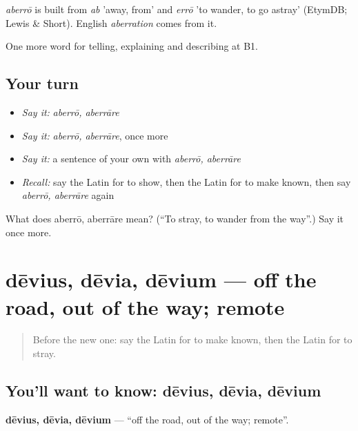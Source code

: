 \begin{cousinweb}
\emph{aberrō} is built from \emph{ab} 'away, from' and \emph{errō} 'to wander, to go astray' (EtymDB; Lewis \& Short). English \emph{aberration} comes from it.
\end{cousinweb}

\begin{grammarlens}[title={What you've built}]
One more word for telling, explaining and describing at B1.
\end{grammarlens}

\subsection*{Your turn}
\begin{itemize}
\raggedright
  \item \emph{Say it:} \emph{aberrō, aberrāre}
  \item \emph{Say it:} \emph{aberrō, aberrāre}, once more
  \item \emph{Say it:} a sentence of your own with \emph{aberrō, aberrāre}
  \item \emph{Recall:} say the Latin for to show, then the Latin for to make known, then say \emph{aberrō, aberrāre} again
\end{itemize}

\begin{tcolorbox}[breakable,colback=teal!4,colframe=teal!35!black,title={Before you move on}]
What does aberrō, aberrāre mean? (\textquotedblleft{}To stray, to wander from the way\textquotedblright{}.) Say it once more.
\end{tcolorbox}
\section[dēvius, dēvia, dēvium]{dēvius, dēvia, dēvium — off the road, out of the way; remote}

\label{lesson:LA-C452-devius}



\begin{quote}
Before the new one: say the Latin for to make known, then the Latin for to stray.
\end{quote}

\subsection*{You'll want to know: dēvius, dēvia, dēvium}
\textbf{dēvius, dēvia, dēvium} — \textquotedblleft{}off the road, out of the way; remote\textquotedblright{}.

